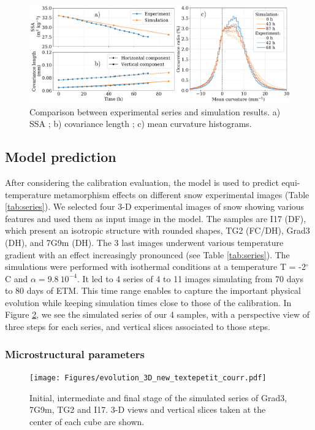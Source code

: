 \documentclass[draft,ms]{agujournal2019}
\begin{document}
\begin{figure}
    \centering
    \includegraphics[width=\linewidth]{Figures/microstruct_EBONI_exp_simu.pdf}
    \caption{Comparison between \protect{} experimental series and simulation results. a) SSA ; b) covariance length ; c) mean curvature histograms.}
    \label{fig:eboni}
\end{figure}


\subsection{Model prediction}
\label{sec:prediction}

After considering the calibration evaluation, the model is used to predict equi-temperature metamorphism effects on different snow experimental images (Table \ref{tab:series}). We selected four 3-D experimental images of snow showing various features and used them as input image in the model. The samples are I17 (DF), which present an isotropic structure with rounded shapes, TG2 (FC/DH), Grad3 (DH), and 7G9m (DH). The 3 last images underwent various temperature gradient with an effect increasingly pronounced (see Table \ref{tab:series}). The simulations were performed with isothermal conditions at a temperature T = -2$^\circ$C and $\alpha = 9.8\ 10^{-4}$. It led to 4 series of 4 to 11 images simulating from 70 days to 80 days of ETM. This time range enables to capture the important physical evolution while keeping simulation times close to those of the calibration. In Figure \ref{fig:evolutions_3D}, we see the simulated series of our 4 samples, with a perspective view of three steps for each series, and vertical slices associated to those steps.\\



\subsubsection{Microstructural parameters}
\begin{figure}
    \centering
    \texttt{[image: Figures/evolution\_3D\_new\_textepetit\_courr.pdf]}
    \caption{Initial, intermediate and final stage of the simulated series of Grad3, 7G9m, TG2 and I17. 3-D views and vertical slices taken at the center of each cube are shown.}
    \label{fig:evolutions_3D}
\end{figure}
\end{document}
